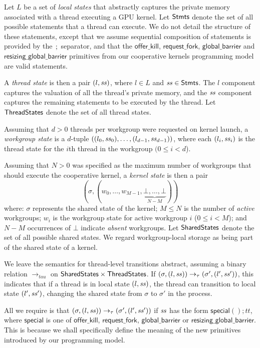 \documentclass[sigconf]{acmart}
\newcommand{\code}[1]{\lstset{basicstyle=\tt}\lstinline!#1!\lstset{basicstyle=\scriptsize\tt}}
\newcommand{\offerfork}{\mathsf{request\_fork}}
\newcommand{\offerkill}{\mathsf{offer\_kill}}
\newcommand{\globalbarrier}{\mathsf{global\_barrier}}
\newcommand{\resizingglobalbarrier}{\mathsf{resizing\_global\_barrier}}
\begin{document}
{
%
Let $L$ be a set of \emph{local states} that abstractly captures the
private memory associated with a thread executing a GPU kernel.  Let
$\mathsf{Stmts}$ denote the set of all possible statements that a
thread can execute.  We do not detail the structure of these
statements, except that we assume sequential composition of statements
is provided by the $\code{;}$ separator, and that the $\offerkill$,
$\offerfork$, $\globalbarrier$ and $\resizingglobalbarrier$ primitives
from our cooperative kernels programming model are valid statements.

A \emph{thread state} is then a pair $(l, \mathit{ss})$, where $l \in L$ and
$\mathit{ss} \in \mathsf{Stmts}$.  The $l$ component captures the valuation of all the
thread's private memory, and the $\mathit{ss}$ component captures the
remaining statements to be executed by the thread.  Let $\mathsf{ThreadStates}$ denote the set of all thread states.

Assuming that $d > 0$ threads per workgroup were requested on kernel launch, a \emph{workgroup state}
is a $d$-tuple $((l_0, \mathit{ss}_0), \dots, (l_{d-1}, \mathit{ss}_{d-1}))$, where each $(l_i, \mathit{ss}_i)$ is the thread state for the $i$th thread in the workgroup $(0\leq i < d$).

Assuming that $N > 0$ was specified as the maximum number of
workgroups that should execute the cooperative kernel, a \emph{kernel
  state} is then a pair
%
\[
(\sigma, (w_0, \dots, w_{M-1}, \underbrace{\bot, \dots,
\bot}_{N-M}))\]
%
where: $\sigma$ represents the shared state of the kernel; $M \leq N$
is the number of \emph{active} workgroups; $w_i$ is the workgroup
state for active workgroup $i$ ($0 \leq i < M$); and $N-M$ occurrences
of $\bot$ indicate \emph{absent} workgroups.  Let $\mathsf{SharedStates}$
denote the set of all possible shared states.  We regard
workgroup-local storage as being part of the shared state of a kernel.

%
We leave the semantics for thread-level transitions abstract, assuming
a binary relation $\rightarrow_{tau}$ on $\mathsf{SharedStates}{} \times
\mathsf{ThreadStates}{}$.  If $(\sigma, (l, \mathit{ss})) \rightarrow_{\tau}
(\sigma', (l', \mathit{ss}'))$, this indicates that if a thread is in local
state $(l, \mathit{ss})$, the thread can transition to local state $(l',
\mathit{ss}')$, changing the shared state from $\sigma$ to $\sigma'$ in the
process.

All we require is that $(\sigma, (l, \mathit{ss})) \rightarrow_{\tau}
(\sigma', (l', \mathit{ss}'))$ if $\mathit{ss}$ has the form $\mathsf{special}();
\mathit{tt}$, where $\mathsf{special}$ is one of $\offerkill$,
$\offerfork$, $\globalbarrier$ or $\resizingglobalbarrier$.  This is
because we shall specifically define the meaning of the new primitives
introduced by our programming model.

}
\end{document}

